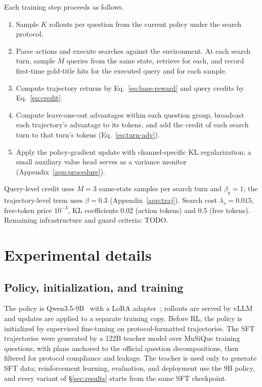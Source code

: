 Each training step proceeds as follows.
\begin{enumerate}\setlength\itemsep{1pt}
\item Sample $K$ rollouts per question from the current policy under the
  search protocol.
\item Parse actions and execute searches against the environment. At
  each search turn, sample $M$ queries from the same state, retrieve
  for each, and record first-time gold-title hits for the executed query
  and for each sample.
\item Compute trajectory returns by Eq.~\ref{eq:base-reward} and query
  credits by Eq.~\ref{eq:credit}.
\item Compute leave-one-out advantages within each question group,
  broadcast each trajectory's advantage to its tokens, and add the
  credit of each search turn to that turn's tokens (Eq.~\ref{eq:turn-adv}).
\item Apply the policy-gradient update with channel-specific KL
  regularization; a small auxiliary value head serves as a variance
  monitor (Appendix~\ref{app:procedure}).
\end{enumerate}
Query-level credit uses $M=3$ same-state samples per search turn and
$\beta_q=1$; the trajectory-level term uses $\beta=0.3$
(Appendix~\ref{app:traj}). Search cost $\lambda_s=0.015$, free-token
price $10^{-3}$, KL coefficients 0.02 (action tokens) and 0.5 (free
tokens). Remaining infrastructure and guard criteria: TODO.

\section{Experimental details}
\label{app:setup}

\subsection{Policy, initialization, and training}
\label{sec:setup-model}

The policy is Qwen3.5-9B~\citep{yang2025qwen3} with a LoRA
adapter~\citep{hu2021lora}; rollouts are served by
vLLM~\citep{Kwon2023memory} and updates are applied to a separate training
copy. Before RL, the policy is initialized by supervised fine-tuning on
protocol-formatted trajectories. The SFT trajectories were generated by
a 122B teacher model over MuSiQue training questions, with plans
anchored to the official question decompositions, then filtered for
protocol compliance and leakage. The teacher is used only to generate
SFT data; reinforcement learning, evaluation, and deployment use the 9B
policy, and every variant of \S\ref{sec:results} starts from the same SFT
checkpoint.

